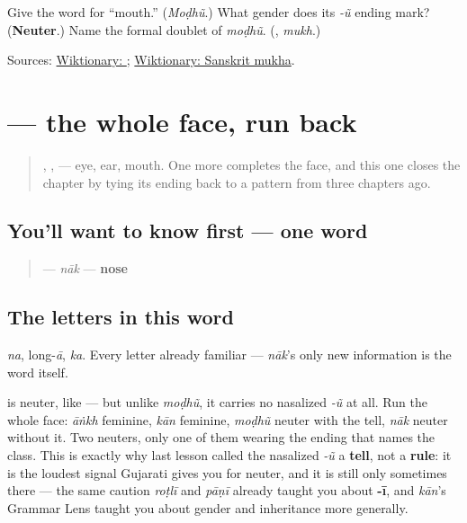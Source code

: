 \begin{tcolorbox}[breakable,colback=teal!4,colframe=teal!35!black,title={Before you move on}]
Give the word for \textquotedblleft{}mouth.\textquotedblright{} (\emph{Moḍhũ}.) What gender does its \emph{-ũ} ending mark? (\textbf{Neuter}.) Name the formal doublet of \emph{moḍhũ}. (\textbf{}, \emph{mukh}.)

Sources: \href{https://en.wiktionary.org/wiki/\%E0\%AA\%AE\%E0\%AB\%8B\%E0\%AA\%82}{Wiktionary: }; \href{https://en.wiktionary.org/wiki/\%E0\%A4\%AE\%E0\%A5\%81\%E0\%A4\%96}{Wiktionary: Sanskrit mukha}.
\end{tcolorbox}
\section[nāk]{ — the whole face, run back}

\label{lesson:GU-C12-naak}



\begin{quote}
\textbf{}, \textbf{}, \textbf{} — eye, ear, mouth. One more completes the face, and this one closes the chapter by tying its ending back to a pattern from three chapters ago.
\end{quote}

\subsection*{You'll want to know first — one word}
\begin{quote}
\textbf{} — \emph{nāk} — \textbf{nose}
\end{quote}

\subsection*{The letters in this word}
\textbf{} \emph{na}, \textbf{} long-\emph{ā}, \textbf{} \emph{ka}. Every letter already familiar — \emph{nāk}'s only new information is the word itself.

\begin{grammarlens}[title={Grammar Lens: closing the chapter's gender count}]
\textbf{} is neuter, like \textbf{} — but unlike \emph{moḍhũ}, it carries no nasalized \emph{-ũ} at all. Run the whole face: \emph{āṅkh} feminine, \emph{kān} feminine, \emph{moḍhũ} neuter with the tell, \emph{nāk} neuter without it. Two neuters, only one of them wearing the ending that names the class. This is exactly why last lesson called the nasalized \emph{-ũ} a \textbf{tell}, not a \textbf{rule}: it is the loudest signal Gujarati gives you for neuter, and it is still only sometimes there — the same caution \emph{roṭlī} and \emph{pāṇī} already taught you about \textbf{-ī}, and \emph{kān}'s Grammar Lens taught you about gender and inheritance more generally.
\end{grammarlens}

